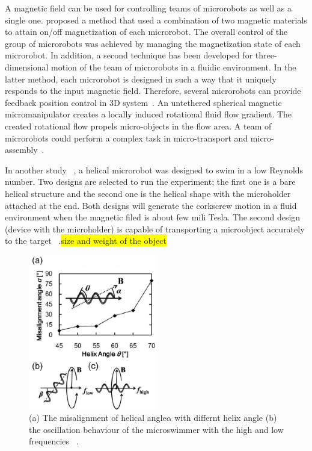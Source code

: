 \documentclass[12pt,a4paper,titlepage]{report}
\newcommand{\hilight}[1]{\colorbox{yellow}{#1}}
\begin{document}
A magnetic field can be used for controlling teams of microrobots as well as a single 
one. \citeauthor{kim2013fabrication} proposed a method that used a combination of two magnetic materials to 
attain on/off magnetization of each microrobot. The overall control of the group of microrobots 
was achieved by managing the magnetization state of each microrobot. In addition, a second technique has been 
developed for three-dimensional motion of the team of microrobots in a fluidic environment. In
 the latter method, each microrobot is designed in such a way that it uniquely responds to the 
input magnetic field. Therefore, several microrobots can provide feedback position control in 
3D system~\citep{kim2013fabrication}.
An untethered spherical magnetic micromanipulator creates a locally induced rotational fluid flow gradient. 
The created rotational flow propels micro-objects in the flow area. A team of microrobots could perform
 a complex task in micro-transport and micro-assembly~\citep{kim2013fabrication}.

In another study ~\citep{tottori2012magnetic}, a helical microrobot was designed to swim in a low Reynolds number. 
Two designs are selected to run the experiment;  the first one is a bare helical structure and the second one is the
 helical shape with the microholder attached at the end. Both designs will generate the corkscrew
 motion in a fluid environment when the magnetic filed is about few mili Tesla. The second 
design (device with the microholder) is capable of transporting a microobject accurately to the 
target ~\citep{tottori2012magnetic}.\hilight{size and weight of the object}


\begin{figure}
  \begin{center}
    \includegraphics[width=0.5\textwidth]{7}
  \caption{(a) The misalignment of helical angle$\alpha$ with differnt helix angle (b) the oscillation behaviour
of the microswimmer with the high and low frequencies ~\citep{tottori2012magnetic}.}
  \label{ref7}
\end{center}
\end{figure}
\end{document}
